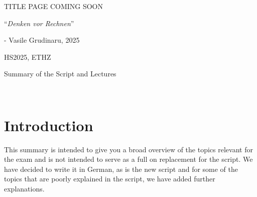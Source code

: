 \documentclass{article}
\begin{document}
\startDocument
\usetcolorboxes
\setcounter{numberingConfig}{3}
\setcounter{numberSubsections}{1}

\vspace{2cm}
\begin{Huge}
    \begin{center}
        TITLE PAGE COMING SOON
    \end{center}
\end{Huge}


\vspace{4cm}
\begin{center}
    \begin{Large}
        ``\textit{Denken vor Rechnen}''
    \end{Large}

    \hspace{3cm} - Vasile Grudinaru, 2025
\end{center}

\vspace{3cm}
\begin{center}
    HS2025, ETHZ\\[0.2cm]
    \begin{Large}
        Summary of the Script and Lectures
    \end{Large}\\[0.2cm]
\end{center}



\newpage
{}



\newpage
\setcounter{section}{-1}
\section{Introduction}
This summary is intended to give you a broad overview of the topics relevant for the exam and is not intended to serve as a full on replacement for the script.
We have decided to write it in German, as is the new script and for some of the topics that are poorly explained in the script, we have added further explanations.
\end{document}
